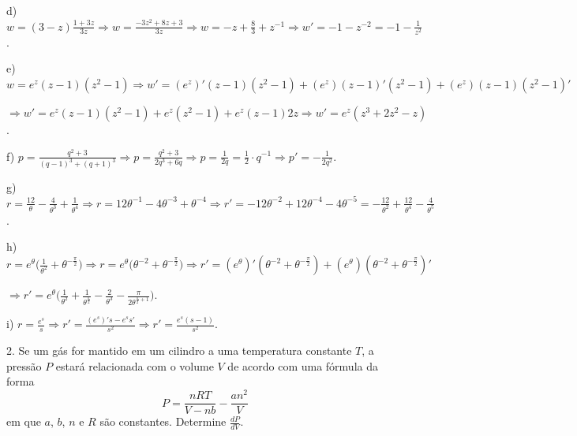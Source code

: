 \documentclass{article}
\begin{document}
{\begin{newpage}
\par
\vspace{0.3cm}
d) $w=(3-z)\displaystyle{\frac{1+3z}{3z}} \Rightarrow w=\displaystyle{\frac{-3z^2 + 8z + 3}{3z}} \Rightarrow w=-z + \frac{8}{3} + z^{-1} \Rightarrow w'=-1-z^{-2} = -1 - \displaystyle{\frac{1}{z^2}}$.
\par
\vspace{0.3cm}
e) $ w=e^{z}(z-1)(z^2 - 1) \Rightarrow w' = (e^z)'(z-1)(z^2 - 1) + (e^z)(z-1)'(z^2 - 1) + (e^z)(z-1)(z^2 - 1)' $\par $ \Rightarrow w' = e^z(z-1)(z^{2}-1) + e^z(z^{2}-1) + e^z(z-1)2z \Rightarrow w' = e^z(z^3 + 2z^2 - z)$.
\par
\vspace{0.3cm}
f) $p=\displaystyle{\frac{q^2 + 3}{(q-1)^3 + (q+1)^3}} \Rightarrow p=\displaystyle{\frac{q^2 + 3}{2q^3 + 6q}} \Rightarrow p = \displaystyle{\frac{1}{2q}} = \frac{1}{2}\cdot q^{-1} \Rightarrow p'=-\displaystyle{\frac{1}{2q^2}}$.
\par
\vspace{0.3cm}
g) $r=\displaystyle{\frac{12}{\theta }} - \displaystyle{\frac{4}{\theta^{3}}} + \displaystyle{\frac{1}{\theta^{4}}} \Rightarrow r=12\theta^{-1} - 4\theta^{-3} + \theta^{-4} \Rightarrow r'=-12\theta^{-2} + 12\theta^{-4} - 4\theta^{-5} = -\displaystyle{\frac{12}{\theta^{2}}} + \displaystyle{\frac{12}{\theta^{4}}} - \displaystyle{\frac{4}{\theta^{5}}}$.
\par
\vspace{0.3cm}
h) $r=e^{\theta }\Big(\displaystyle{\frac{1}{\theta^{2}}} + \theta^{-\frac{\pi }{2}}\Big) \Rightarrow r=e^{\theta }\Big(\theta^{-2} + \theta^{-\frac{\pi }{2}}\Big) \Rightarrow r'=(e^{\theta })'(\theta^{-2} + \theta^{-\frac{\pi }{2}}) + (e^{\theta })(\theta^{-2} + \theta^{-\frac{\pi }{2}})' $\par $\Rightarrow r'=e^{\theta }\Big(\displaystyle{\frac{1}{\theta^{2}}} + \displaystyle{\frac{1}{\theta^{\frac{\pi }{2}}}} - \displaystyle{\frac{2}{\theta^{3}}} - \displaystyle{\frac{\pi }{2\theta^{\frac{\pi }{2} + 1}}}\Big)$.
\par
\vspace{0.3cm}
i) $r=\displaystyle{\frac{e^s}{s}} \Rightarrow r'=\displaystyle{\frac{(e^{s})'s - e^{s}s'}{s^2}} \Rightarrow r'=\displaystyle{\frac{e^{s}(s-1)}{s^2}}$.
\par
\vspace{0.3cm}
\begin{flushleft}
2. Se um gás for mantido em um cilindro a uma temperatura constante $T$, a pressão $P$ estará relacionada com o volume $V$ de acordo com uma fórmula da forma $$P=\displaystyle{\frac{nRT}{V-nb}} - \displaystyle{\frac{an^2}{V}}$$ em que $a$, $b$, $n$ e $R$ são constantes. Determine $\displaystyle{\frac{dP}{dV}}$.

\end{flushleft}
\end{newpage}}
\end{document}
